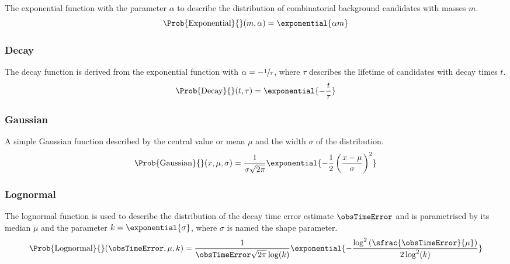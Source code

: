 The exponential function with the parameter $\alpha$ to describe \eg the
distribution of combinatorial background candidates with masses $m$.
%
\begin{equation}\label{eq:measurement_of_sin2beta:likelihood_fit:pdfs:exponential}
  \Prob{\text{Exponential}}{}(m, \alpha) = \exponential{\alpha m}
\end{equation}

\subsubsection{Decay}
\label{sec:measurement_of_sin2beta:likelihood_fit:pdfs:decay}

The decay function is derived from the exponential function with $\alpha =
-\sfrac{1}{\tau}$, where $\tau$ describes the lifetime of candidates with decay
times $t$.
%
\begin{equation}\label{eq:measurement_of_sin2beta:likelihood_fit:pdfs:decay}
  \Prob{\text{Decay}}{}(t, \tau) = \exponential{- \frac{t}{\tau}}
\end{equation}

\subsubsection{Gaussian}
\label{sec:measurement_of_sin2beta:likelihood_fit:pdfs:gaussian}

A simple Gaussian function described by the central value or mean $\mu$ and the
width $\sigma$ of the distribution.
%
\begin{equation}\label{eq:measurement_of_sin2beta:likelihood_fit:pdfs:gaussian}
  \Prob{\text{Gaussian}}{}(x, \mu, \sigma) = \frac{1}{\sigma\sqrt{2\pi}}\exponential{-\frac{1}{2} \left(\frac{x-\mu}{\sigma}\right)^2}
\end{equation}

\subsubsection{Lognormal}
\label{sec:measurement_of_sin2beta:likelihood_fit:pdfs:lognormal}

The lognormal function is \eg used to describe the distribution of the decay
time error estimate $\obsTimeError$ and is parametrised by its median $\mu$ and
the parameter $k = \exponential{\sigma}$, where $\sigma$ is named the shape
parameter.
%
\begin{equation}\label{eq:measurement_of_sin2beta:likelihood_fit:pdfs:lognormal}
  \Prob{\text{Lognormal}}{}(\obsTimeError, \mu, k) = \frac{1}{\obsTimeError \sqrt{2\pi} \log (k)} \exponential{-\frac{\log^2 \left(\sfrac{\obsTimeError}{\mu}\right)}{2 \log^2(k)}}
\end{equation}

